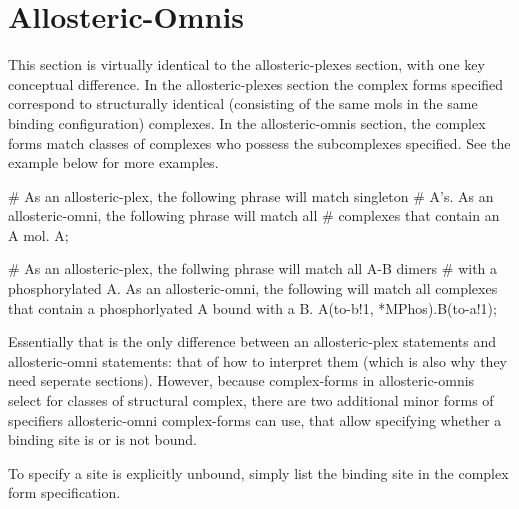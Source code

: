 \section{Allosteric-Omnis}
This section is virtually identical to the allosteric-plexes section,
with one key conceptual difference.  In the allosteric-plexes section
the complex forms specified correspond to structurally identical
(consisting of the same mols in the same binding configuration)
complexes.  In the allosteric-omnis section, the complex forms match
classes of complexes who possess the subcomplexes specified.  See the
example below for more examples.


\begin{ExampleMZR}

# As an allosteric-plex, the following phrase will match singleton
# A's.  As an allosteric-omni, the following phrase will match all
# complexes that contain an A mol.
A; 

# As an allosteric-plex, the follwing phrase will match all A-B dimers 
# with a phosphorylated A.  As an allosteric-omni, the following will
match all complexes that contain a phosphorlyated A bound with a B.
A(to-b!1, *M{Phos}).B(to-a!1);

\end{ExampleMZR}

Essentially that is the only difference between an allosteric-plex
statements and allosteric-omni statements: that of how to interpret
them (which is also why they need seperate sections).  However,
because complex-forms in allosteric-omnis select for classes of
structural complex, there are two additional minor forms of
specifiers allosteric-omni complex-forms can use, that allow specifying
whether a binding site is or is not bound.  

To specify a site is explicitly unbound, simply list the binding site in the
complex form specification.

